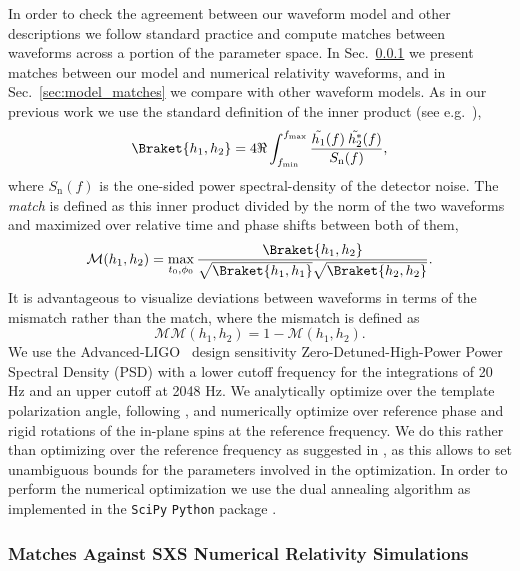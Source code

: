 \documentclass[%
aps,
prd,
amssymb,
amsmath,
amsfonts,
eqsecnum,
showpacs,
nofootinbib,
floatfix,
twocolumn,
twoside,
a4paper,
superscriptaddress
]{revtex4-1}
\begin{document}
In order to check the agreement between our waveform model and other descriptions we follow standard practice and compute matches between waveforms across a portion of the parameter space.
In Sec.~\ref{sec:NR_matches} we present matches between our model and numerical relativity waveforms, and
in Sec.~\ref{sec:model_matches} we compare with other waveform models. 
%
As in our previous work \cite{Pratten:2020fqn,Garcia-Quiros:2020qpx} we use the standard definition of the inner product (see e.g.~\cite{Cutler:1994ys}),
\begin{equation}
\Braket{h_1, h_2} = 4 \Re \int_{f_{\min}}^{f_{\max}} \frac{\tilde{h_1}(f) \:\tilde{h^*_2}(f)}{S_\mathrm{n}(f)},
\end{equation}
where $S_\mathrm{n}(f)$ is the one-sided power spectral-density of the detector noise. 
The \textit{match} is defined as this inner product divided by the norm of the two waveforms and maximized over relative time and phase shifts between both of them,
\begin{equation}
\mathcal{M}(h_1,h_2) = \max_{t_0, \phi_0} \frac{\Braket{h_1, h_2}}{\sqrt{\Braket{h_1, h_1}}\sqrt{\Braket{h_2, h_2}}}.
\end{equation}
It is advantageous to visualize deviations between waveforms in terms of the mismatch rather than the match, where the mismatch is defined as
\begin{equation}
\mathcal{MM}(h_1,h_2)=1-\mathcal{M}(h_1,h_2).
\end{equation}
We use the Advanced-LIGO~\cite{TheLIGOScientific:2014jea} design sensitivity Zero-Detuned-High-Power Power Spectral Density (PSD) \cite{adligopsd} with a lower cutoff frequency for the integrations of 20 Hz and an upper cutoff at 2048 Hz. 
We analytically optimize over the template polarization angle, following \cite{PhysRevD.94.024012}, and numerically optimize over reference phase and rigid rotations of the in-plane spins at the reference frequency. We do this rather than optimizing over the reference frequency as suggested in \cite{Khan:2019kot}, as this allows to set unambiguous bounds for the parameters involved in the optimization. In order to perform the numerical optimization we use the dual annealing algorithm as implemented in the {\tt SciPy} {\tt Python} package \cite{2020SciPy-NMeth}. 


\subsubsection{Matches Against SXS Numerical Relativity Simulations}\label{sec:NR_matches}
\end{document}
